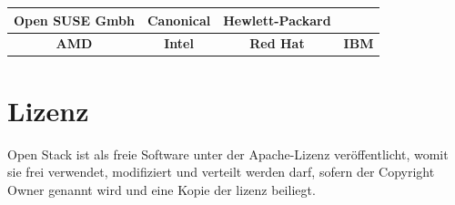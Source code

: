 \documentclass[a4paper,nochapterprefix,english,12pt]{scrreprt}
\begin{document}
\begin{table}[h]
\begin{tabular}{|c|c|c|c}
\hline
\textbf{Open  SUSE Gmbh} & \textbf{Canonical} & \textbf{Hewlett-Packard} &                                 \\ \hline
\textbf{AMD}             & \textbf{Intel}     & \textbf{Red Hat}         &\textbf{IBM} 					   \\ \hline
\end{tabular}
\end{table} \cite{RS-WikiEntry}\cite{OS-WikiEntry}
\section{Lizenz}
Open Stack ist als freie Software unter der Apache-Lizenz veröffentlicht, womit sie frei verwendet, modifiziert und verteilt werden darf, sofern der Copyright Owner genannt wird und eine Kopie der lizenz beiliegt.\cite{OS-WikiEntry}

\newpage
\end{document}
